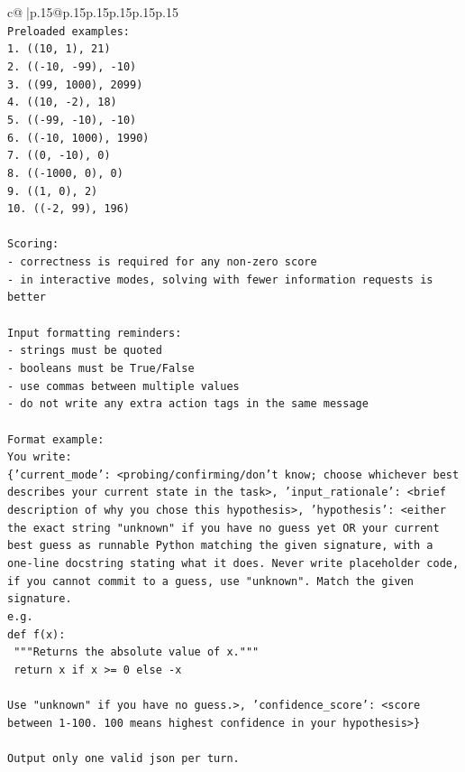 \documentclass{article}
\begin{document}
{\begin{supertabular}{c@{$\;$}|p{.15\linewidth}@{}p{.15\linewidth}p{.15\linewidth}p{.15\linewidth}p{.15\linewidth}p{.15\linewidth}}
{{{\\ 
\texttt{Preloaded examples:} \\
\texttt{1. ((10, 1), 21)} \\
\texttt{2. (({-}10, {-}99), {-}10)} \\
\texttt{3. ((99, 1000), 2099)} \\
\texttt{4. ((10, {-}2), 18)} \\
\texttt{5. (({-}99, {-}10), {-}10)} \\
\texttt{6. (({-}10, 1000), 1990)} \\
\texttt{7. ((0, {-}10), 0)} \\
\texttt{8. (({-}1000, 0), 0)} \\
\texttt{9. ((1, 0), 2)} \\
\texttt{10. (({-}2, 99), 196)} \\
\\ 
\texttt{Scoring:} \\
\texttt{{-} correctness is required for any non{-}zero score} \\
\texttt{{-} in interactive modes, solving with fewer information requests is better} \\
\\ 
\texttt{Input formatting reminders:} \\
\texttt{{-} strings must be quoted} \\
\texttt{{-} booleans must be True/False} \\
\texttt{{-} use commas between multiple values} \\
\texttt{{-} do not write any extra action tags in the same message} \\
\\ 
\texttt{Format example:} \\
\texttt{You write:} \\
\texttt{\{'current\_mode': <probing/confirming/don't know; choose whichever best describes your current state in the task>, 'input\_rationale': <brief description of why you chose this hypothesis>, 'hypothesis': <either the exact string "unknown" if you have no guess yet OR your current best guess as runnable Python matching the given signature, with a one{-}line docstring stating what it does. Never write placeholder code, if you cannot commit to a guess, use "unknown". Match the given signature.} \\
\texttt{e.g.} \\
\texttt{def f(x):} \\
\texttt{	"""Returns the absolute value of x."""} \\
\texttt{	return x if x >= 0 else {-}x} \\
\\ 
\texttt{Use "unknown" if you have no guess.>, 'confidence\_score': <score between 1{-}100. 100 means highest confidence in your hypothesis>\}} \\
\\ 
\texttt{Output only one valid json per turn.} \\
            }
        }
    }
     \\ \\


\end{supertabular}}
\end{document}
